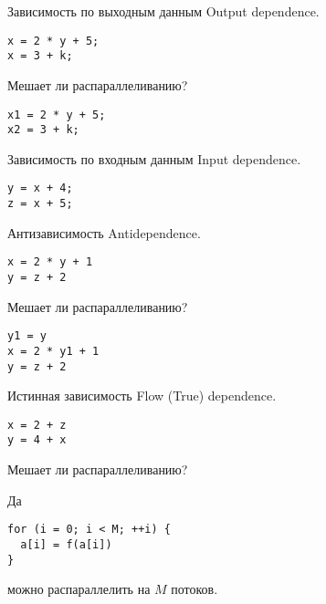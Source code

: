 \begin{frame}[fragile]{Зависимость по выходным данным}
Output dependence.

\pause\bigskip

\begin{lstlisting}
x = 2 * y + 5;
x = 3 + k;
\end{lstlisting}

Мешает ли распараллеливанию?

\pause\bigskip

\begin{lstlisting}
x1 = 2 * y + 5;
x2 = 3 + k;
\end{lstlisting}
\end{frame}

\begin{frame}[fragile]{Зависимость по входным данным}
Input dependence.

\pause\bigskip

\begin{lstlisting}
y = x + 4;
z = x + 5;
\end{lstlisting}
\end{frame}

\begin{frame}[fragile]{Антизависимость}
Antidependence.

\pause\bigskip

\begin{lstlisting}
x = 2 * y + 1
y = z + 2
\end{lstlisting}

Мешает ли распараллеливанию?

\pause

\begin{lstlisting}
y1 = y
x = 2 * y1 + 1
y = z + 2
\end{lstlisting}
\end{frame}

\begin{frame}[fragile]{Истинная зависимость}
Flow (True) dependence.

\pause\bigskip

\begin{lstlisting}
x = 2 + z
y = 4 + x
\end{lstlisting}

\pause\bigskip

Мешает ли распараллеливанию?

\pause\bigskip

Да
\end{frame}

\begin{frame}[fragile]

\begin{lstlisting}
for (i = 0; i < M; ++i) {
  a[i] = f(a[i])
}
\end{lstlisting}

можно распараллелить на $M$ потоков.

\end{frame}

